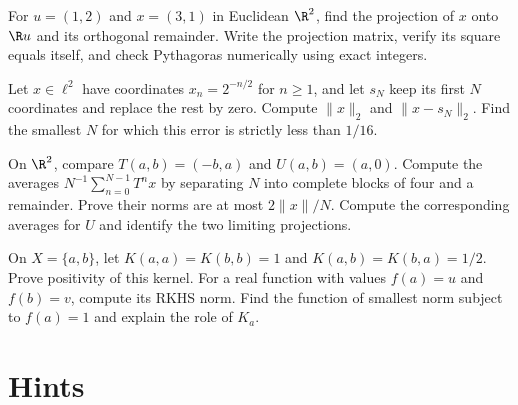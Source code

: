\begin{exercise}[$\star$]\label{ex:v8c02a}
For $u=(1,2)$ and $x=(3,1)$ in Euclidean $\R^2$, find the projection of $x$ onto $\R u$ and its orthogonal remainder. Write the projection matrix, verify its square equals itself, and check Pythagoras numerically using exact integers.
\end{exercise}
\begin{exercise}[$\star$]\label{ex:v8c02b}
Let $x\in\ell^2$ have coordinates $x_n=2^{-n/2}$ for $n\ge1$, and let $s_N$ keep its first $N$ coordinates and replace the rest by zero. Compute $\|x\|_2$ and $\|x-s_N\|_2$. Find the smallest $N$ for which this error is strictly less than $1/16$.
\end{exercise}
\begin{exercise}[$\star\star$]\label{ex:v8c02c}
On $\R^2$, compare $T(a,b)=(-b,a)$ and $U(a,b)=(a,0)$. Compute the averages $N^{-1}\sum_{n=0}^{N-1}T^nx$ by separating $N$ into complete blocks of four and a remainder. Prove their norms are at most $2\|x\|/N$. Compute the corresponding averages for $U$ and identify the two limiting projections.
\end{exercise}
\begin{exercise}[$\star\star$]\label{ex:v8c02d}
On $X=\{a,b\}$, let $K(a,a)=K(b,b)=1$ and $K(a,b)=K(b,a)=1/2$. Prove positivity of this kernel. For a real function with values $f(a)=u$ and $f(b)=v$, compute its RKHS norm. Find the function of smallest norm subject to $f(a)=1$ and explain the role of $K_a$.
\end{exercise}

\section{Hints}

